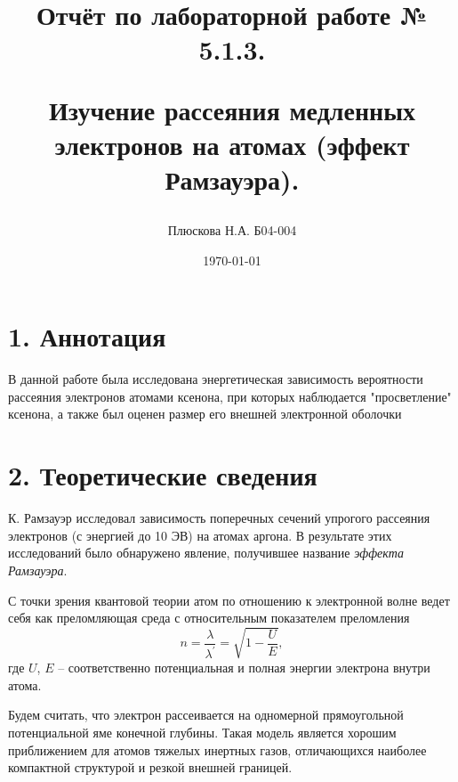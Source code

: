 \documentclass[a4paper,12pt]{report}
\title{Отчёт по лабораторной работе № 5.1.3. 

Изучение рассеяния медленных электронов на атомах (эффект Рамзауэра).}
\author{Плюскова Н.А. Б04-004 }
\date{\today}
\begin{document}
\maketitle
\section*{1. Аннотация}
В данной работе была исследована энергетическая зависимость вероятности рассеяния электронов атомами ксенона, при которых наблюдается "просветление" ксенона, а также был оценен размер его внешней электронной оболочки


\section*{2. Теоретические сведения}
К. Рамзауэр исследовал зависимость поперечных сечений упрогого рассеяния электронов (с энергией до 10 ЭВ) на атомах аргона. В результате этих исследований было обнаружено явление, получившее название \textit{эффекта Рамзауэра}.
	
	С точки зрения квантовой теории атом по отношению к электронной волне ведет себя как преломляющая среда с относительным показателем преломления
	\begin{equation*}
		n = \frac{\lambda}{\lambda^\prime} = \sqrt{1-\frac{U}{E}},
	\end{equation*}
	где $U$, $E$ -- соответственно потенциальная и полная энергии электрона внутри атома.
	
	Будем считать, что электрон рассеивается на одномерной прямоугольной потенциальной яме конечной глубины. Такая модель является хорошим приближением для атомов тяжелых инертных газов, отличающихся наиболее компактной структурой и резкой внешней границей.
	
\end{document}
